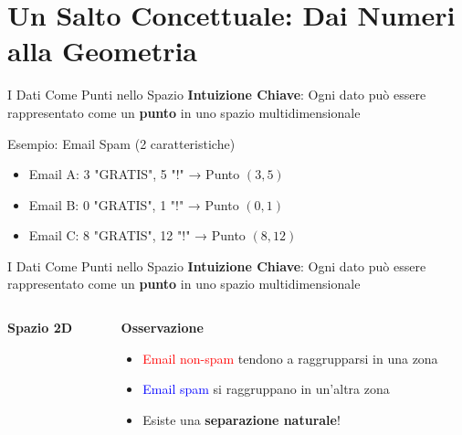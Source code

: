 \documentclass[aspectratio=169]{beamer}
\begin{document}
\section{Un Salto Concettuale: Dai Numeri alla Geometria}
%
%
\begin{frame}{I Dati Come Punti nello Spazio}
\textbf{Intuizione Chiave}: Ogni dato può essere rappresentato come un \textbf{punto} in uno spazio multidimensionale

\vspace{0.5cm}

\begin{block}{Esempio: Email Spam (2 caratteristiche)}
\begin{itemize}
    \item Email A: 3 "GRATIS", 5 "!" → Punto $(3, 5)$
    \item Email B: 0 "GRATIS", 1 "!" → Punto $(0, 1)$  
    \item Email C: 8 "GRATIS", 12 "!" → Punto $(8, 12)$
\end{itemize}
\end{block}

\end{frame}
%
%
\begin{frame}{I Dati Come Punti nello Spazio}
\textbf{Intuizione Chiave}: Ogni dato può essere rappresentato come un \textbf{punto} in uno spazio multidimensionale

\vspace{0.5cm}

\begin{columns}
\begin{column}{0.5\textwidth}
\textbf{Spazio 2D}
\begin{center}
\end{center}
\end{column}

\begin{column}{0.5\textwidth}
\textbf{Osservazione}
\begin{itemize}
    \item \textcolor{red}{Email non-spam} tendono a raggrupparsi in una zona
    \item \textcolor{blue}{Email spam} si raggruppano in un'altra zona
    \item Esiste una \textbf{separazione naturale}!
\end{itemize}
\end{column}
\end{columns}
\end{frame}
\end{document}
